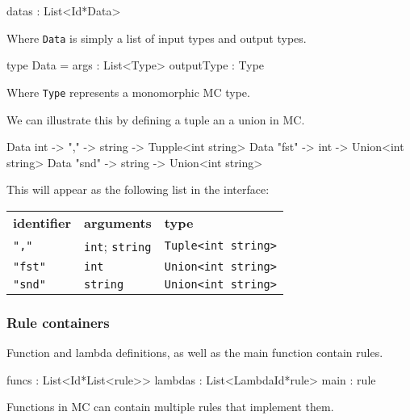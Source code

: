 \begin{FS}
datas : List<Id*Data>
\end{FS}

Where \verb|Data| is simply a list of input types and output types.

\begin{FS}
type Data = {
  args       : List<Type>
  outputType : Type
}
\end{FS}

Where \verb|Type| represents a monomorphic MC type.


We can illustrate this by defining a tuple an a union in MC.

\begin{MC}
Data int -> "," -> string -> Tupple<int string>
Data "fst" -> int    -> Union<int string>
Data "snd" -> string -> Union<int string>
\end{MC}

This will appear as the following list in the interface:

{\footnotesize
\begin{tabular}{lll}
    \textbf{\normalsize identifier} & \textbf{\normalsize arguments} & \textbf{\normalsize type}\\
    \verb:",":   & \verb:int:; \verb:string: & \verb:Tuple<int string>: \\
    \verb:"fst": & \verb:int:                & \verb:Union<int string>: \\
    \verb:"snd": & \verb:string:             & \verb:Union<int string>: \\
\end{tabular}
}


\subsubsection{Rule containers}

Function and lambda definitions, as well as the main function contain rules.

\begin{FS}
  funcs   : List<Id*List<rule>>
  lambdas : List<LambdaId*rule>
  main    : rule
\end{FS}

Functions in MC can contain multiple rules that implement them.


